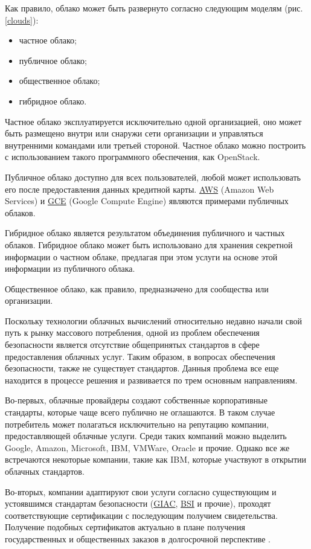 Как правило, облако может быть развернуто согласно следующим моделям (рис. \ref{clouds}):
\begin{itemize}
  \item частное облако;
  \item публичное облако;
  \item общественное облако;
  \item гибридное облако.
\end{itemize}


Частное облако эксплуатируется исключительно одной организацией, оно может быть размещено внутри или снаружи сети организации и управляться внутренними командами или третьей стороной.
Частное облако можно построить с использованием такого программного обеспечения, как OpenStack.

Публичное облако доступно для всех пользователей, любой может использовать его после предоставления данных кредитной карты.
\hyperlink{aws}{AWS} (Amazon Web Services) и \hyperlink{gce}{GCE} (Google Compute Engine) являются примерами публичных облаков.

Гибридное облако является результатом объединения публичного и частных облаков.
Гибридное облако может быть использовано для хранения секретной информации о частном облаке, предлагая при этом услуги на основе этой информации из публичного облака.

Общественное облако, как правило, предназначено для сообщества или организации.

Поскольку технологии облачных вычислений относительно недавно начали свой путь к рынку массового потребления, одной из проблем обеспечения безопасности является отсутствие общепринятых стандартов в сфере предоставления облачных услуг.
Таким образом, в вопросах обеспечения безопасности, также не существует стандартов.
Данныя проблема все еще находится в процессе решения и развивается по трем основным направлениям.

Во-первых, облачные провайдеры создают собственные корпоративные стандарты, которые чаще всего публично не оглашаются.
В таком случае потребитель может полагаться исключительно на репутацию компании, предоставляющей облачные услуги.
Среди таких компаний можно выделить Google, Amazon, Microsoft, IBM, VMWare, Oracle и прочие.
Однако все же встречаются некоторые компании, такие как IBM, которые участвуют в открытии облачных стандартов.

Во-вторых, компании адаптируют свои услуги согласно существующим и устоявшимся стандартам безопасности (\hyperlink{giac}{GIAC}, \hyperlink{bsi}{BSI} и прочие), проходят соответствующие сертификации с последующим получием свидетельства.
Получение подобных сертификатов актуально в плане получения государственных и общественных заказов в долгосрочной перспективе \cite{itmo}.

